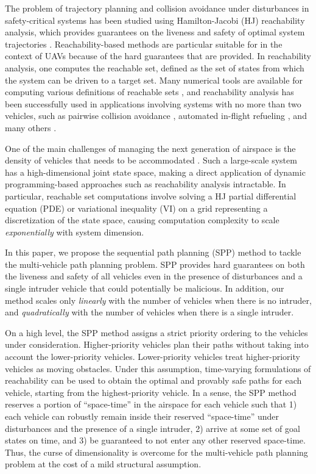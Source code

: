 The problem of trajectory planning and collision avoidance under disturbances in safety-critical systems has been studied using Hamilton-Jacobi (HJ) reachability analysis, which provides guarantees on the liveness and safety of optimal system trajectories \cite{Barron90, Mitchell05, Bokanowski10, Bokanowski11, Margellos11, Fisac15}. Reachability-based methods are particular suitable for in the context of UAVs because of the hard guarantees that are provided. In reachability analysis, one computes the reachable set, defined as the set of states from which the system can be driven to a target set. Many numerical tools are available for computing various definitions of reachable sets \cite{Sethian96, Osher02, Mitchell02, Mitchell07}, and reachability analysis has been successfully used in applications involving systems with no more than two vehicles, such as pairwise collision avoidance \cite{Mitchell05}, automated in-flight refueling \cite{Ding08}, and many others \cite{Huang11, Bayen07}.

One of the main challenges of managing the next generation of airspace is the density of vehicles that needs to be accommodated \cite{Kopardekar16}. Such a large-scale system has a high-dimensional joint state space, making a direct application of dynamic programming-based approaches such as reachability analysis intractable. In particular, reachable set computations involve solving a HJ partial differential equation (PDE) or variational inequality (VI) on a grid representing a discretization of the state space, causing computation complexity to scale \textit{exponentially} with system dimension.

In this paper, we propose the sequential path planning (SPP) method to tackle the multi-vehicle path planning problem. SPP provides hard guarantees on both the liveness and safety of all vehicles even in the presence of disturbances and a single intruder vehicle that could potentially be malicious. In addition, our method scales only \textit{linearly} with the number of vehicles when there is no intruder, and \textit{quadratically} with the number of vehicles when there is a single intruder. 

On a high level, the SPP method assigns a strict priority ordering to the vehicles under consideration. Higher-priority vehicles plan their paths without taking into account the lower-priority vehicles. Lower-priority vehicles treat higher-priority vehicles as moving obstacles. Under this assumption, time-varying formulations of reachability \cite{Bokanowski11, Fisac15} can be used to obtain the optimal and provably safe paths for each vehicle, starting from the highest-priority vehicle. In a sense, the SPP method reserves a portion of ``space-time'' in the airspace for each vehicle such that 1) each vehicle can robustly remain inside their reserved ``space-time'' under disturbances and the presence of a single intruder, 2) arrive at some set of goal states on time, and 3) be guaranteed to not enter any other reserved space-time. Thus, the curse of dimensionality is overcome for the multi-vehicle path planning problem at the cost of a mild structural assumption. 


